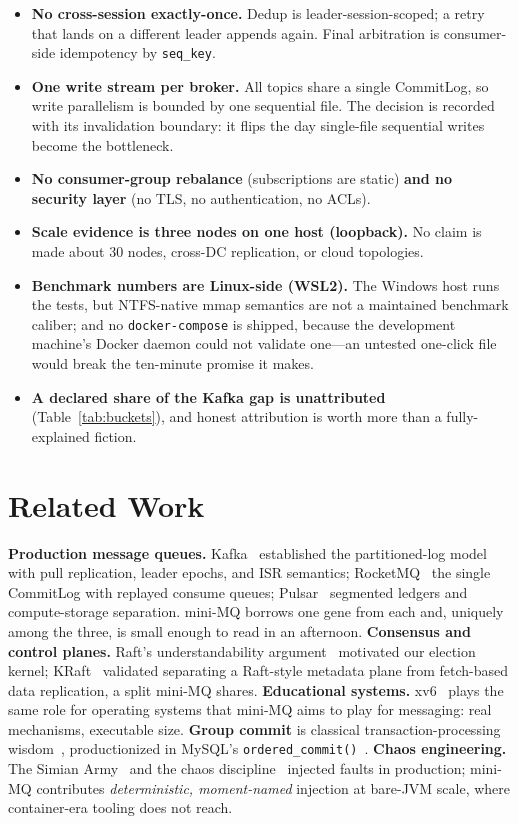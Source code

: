 \documentclass[letterpaper,twocolumn,10pt]{article}
\begin{document}
\begin{itemize}
\item \textbf{No cross-session exactly-once.} Dedup is
  leader-session-scoped; a retry that lands on a different leader
  appends again. Final arbitration is consumer-side idempotency by
  \texttt{seq\_key}.
\item \textbf{One write stream per broker.} All topics share a single
  CommitLog, so write parallelism is bounded by one sequential file.
  The decision is recorded with its invalidation boundary: it flips
  the day single-file sequential writes become the bottleneck.
\item \textbf{No consumer-group rebalance} (subscriptions are static)
  \textbf{and no security layer} (no TLS, no authentication, no ACLs).
\item \textbf{Scale evidence is three nodes on one host (loopback).} No
  claim is made about 30 nodes, cross-DC replication, or cloud
  topologies.
\item \textbf{Benchmark numbers are Linux-side (WSL2).} The Windows
  host runs the tests, but NTFS-native mmap semantics are not a
  maintained benchmark caliber; and no \texttt{docker-compose} is
  shipped, because the development machine's Docker daemon could not
  validate one---an untested one-click file would break the ten-minute
  promise it makes.
\item \textbf{A declared share of the Kafka gap is unattributed}
  (Table~\ref{tab:buckets}), and honest attribution is worth more
  than a fully-explained fiction.
\end{itemize}

\section{Related Work}
\textbf{Production message queues.} Kafka~\cite{kreps11kafka,kafkadocs}
established the partitioned-log model with pull replication, leader
epochs, and ISR semantics; RocketMQ~\cite{rocketmqdocs} the single
CommitLog with replayed consume queues; Pulsar~\cite{pulsardocs}
segmented ledgers and compute-storage separation. mini-MQ borrows one
gene from each and, uniquely among the three, is small enough to read
in an afternoon. \textbf{Consensus and control planes.} Raft's
understandability argument~\cite{ongaro14raft} motivated our election
kernel; KRaft~\cite{kip500} validated separating a Raft-style metadata
plane from fetch-based data replication, a split mini-MQ shares.
\textbf{Educational systems.} xv6~\cite{xv6} plays the same role for
operating systems that mini-MQ aims to play for messaging: real
mechanisms, executable size. \textbf{Group commit} is classical
transaction-processing wisdom~\cite{gray93tp}, productionized in
MySQL's \texttt{ordered\_commit()}~\cite{mysqlbinlog}. \textbf{Chaos
engineering.} The Simian Army~\cite{netflix11simian} and the chaos
discipline~\cite{basiri16chaos} injected faults in production; mini-MQ
contributes \emph{deterministic, moment-named} injection at bare-JVM
scale, where container-era tooling does not reach.
\end{document}
